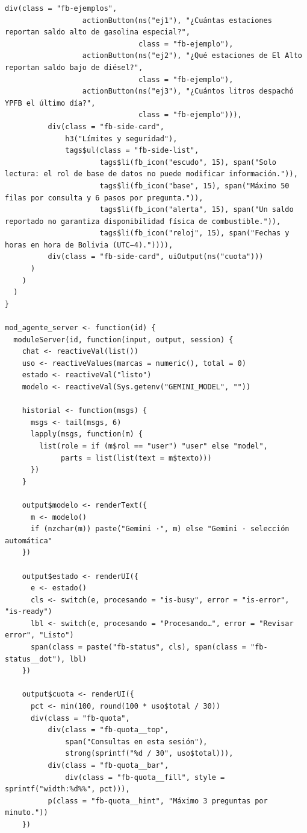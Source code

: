 \begin{lstlisting}[style=anexoR]
              div(class = "fb-ejemplos",
                  actionButton(ns("ej1"), "¿Cuántas estaciones reportan saldo alto de gasolina especial?",
                               class = "fb-ejemplo"),
                  actionButton(ns("ej2"), "¿Qué estaciones de El Alto reportan saldo bajo de diésel?",
                               class = "fb-ejemplo"),
                  actionButton(ns("ej3"), "¿Cuántos litros despachó YPFB el último día?",
                               class = "fb-ejemplo"))),
          div(class = "fb-side-card",
              h3("Límites y seguridad"),
              tags$ul(class = "fb-side-list",
                      tags$li(fb_icon("escudo", 15), span("Solo lectura: el rol de base de datos no puede modificar información.")),
                      tags$li(fb_icon("base", 15), span("Máximo 50 filas por consulta y 6 pasos por pregunta.")),
                      tags$li(fb_icon("alerta", 15), span("Un saldo reportado no garantiza disponibilidad física de combustible.")),
                      tags$li(fb_icon("reloj", 15), span("Fechas y horas en hora de Bolivia (UTC−4).")))),
          div(class = "fb-side-card", uiOutput(ns("cuota")))
      )
    )
  )
}

mod_agente_server <- function(id) {
  moduleServer(id, function(input, output, session) {
    chat <- reactiveVal(list())
    uso <- reactiveValues(marcas = numeric(), total = 0)
    estado <- reactiveVal("listo")
    modelo <- reactiveVal(Sys.getenv("GEMINI_MODEL", ""))

    historial <- function(msgs) {
      msgs <- tail(msgs, 6)
      lapply(msgs, function(m) {
        list(role = if (m$rol == "user") "user" else "model",
             parts = list(list(text = m$texto)))
      })
    }

    output$modelo <- renderText({
      m <- modelo()
      if (nzchar(m)) paste("Gemini ·", m) else "Gemini · selección automática"
    })

    output$estado <- renderUI({
      e <- estado()
      cls <- switch(e, procesando = "is-busy", error = "is-error", "is-ready")
      lbl <- switch(e, procesando = "Procesando…", error = "Revisar error", "Listo")
      span(class = paste("fb-status", cls), span(class = "fb-status__dot"), lbl)
    })

    output$cuota <- renderUI({
      pct <- min(100, round(100 * uso$total / 30))
      div(class = "fb-quota",
          div(class = "fb-quota__top",
              span("Consultas en esta sesión"),
              strong(sprintf("%d / 30", uso$total))),
          div(class = "fb-quota__bar",
              div(class = "fb-quota__fill", style = sprintf("width:%d%%", pct))),
          p(class = "fb-quota__hint", "Máximo 3 preguntas por minuto."))
    })


\end{lstlisting}
